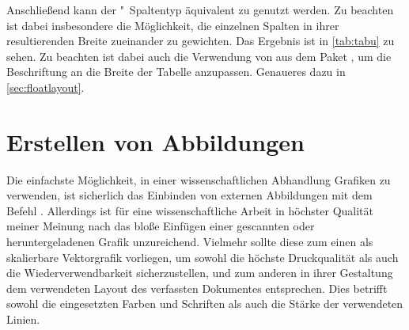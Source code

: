 \documentclass[%
  english,ngerman,%
  geometry=no,DIV=12,automark,%
]{tudscrartcl}
\begin{document}
%
Anschließend kann der "~Spaltentyp äquivalent zu  genutzt 
werden. Zu beachten ist dabei insbesondere die Möglichkeit, die einzelnen 
Spalten in ihrer resultierenden Breite zueinander zu gewichten. Das Ergebnis 
ist in \autoref{tab:tabu} zu sehen. Zu beachten ist dabei auch die Verwendung 
von  aus dem Paket , um die Beschriftung an 
die Breite der Tabelle anzupassen. Genaueres dazu in \autoref{sec:floatlayout}.
%
\begin{Trunk}
\begin{table}
\end{table}

\end{Trunk}
\InputCode



\section{Erstellen von Abbildungen}
\label{sec:figures}
Die einfachste Möglichkeit, in einer wissenschaftlichen Abhandlung Grafiken zu 
verwenden, ist sicherlich das Einbinden von externen Abbildungen mit dem Befehl 
. Allerdings ist für eine wissenschaftliche Arbeit in 
höchster Qualität meiner Meinung nach das bloße Einfügen einer gescannten oder 
heruntergeladenen Grafik unzureichend. Vielmehr sollte diese zum einen als 
skalierbare Vektorgrafik vorliegen, um sowohl die höchste Druckqualität als 
auch die Wiederverwendbarkeit sicherzustellen, und zum anderen in ihrer 
Gestaltung dem verwendeten Layout des verfassten Dokumentes entsprechen. Dies 
betrifft sowohl die eingesetzten Farben und Schriften als auch die Stärke der 
verwendeten Linien.
\end{document}

